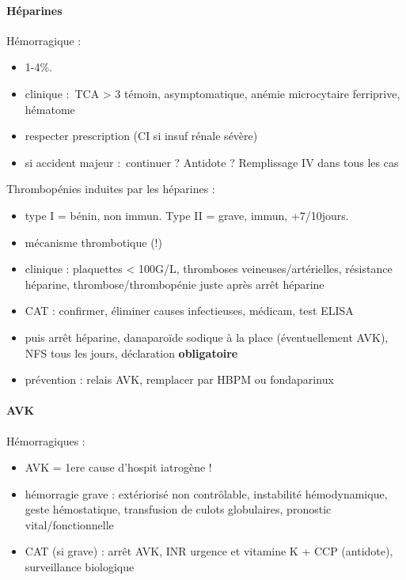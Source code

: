 \paragraph{Héparines}
Hémorragique : 
\begin{itemize}
  \item 1-4\%.
  \item clinique : TCA > 3 témoin, asymptomatique, anémie microcytaire
    ferriprive, hématome
  \item respecter prescription (CI si insuf rénale sévère)
  \item si accident majeur : continuer ? Antidote ? Remplissage IV dans tous les
    cas
\end{itemize}
Thrombopénies induites par les héparines : 
\begin{itemize}
  \item type I = bénin, non immun. Type II = grave, immun, +7/10jours.
  \item mécanisme thrombotique (!)
  \item clinique : plaquettes < 100G/L, thromboses veineuses/artérielles,
    résistance héparine, thrombose/thrombopénie juste après arrêt héparine
  \item CAT : confirmer, éliminer causes infectieuses, médicam, test ELISA
  \item puis arrêt héparine, danaparoïde sodique à la place (éventuellement
    AVK), NFS tous les jours, déclaration \textbf{obligatoire} 
  \item prévention : relais AVK, remplacer par HBPM ou fondaparinux
\end{itemize}

\paragraph{AVK}
Hémorragiques : 
\begin{itemize}
  \item AVK = 1ere cause d'hospit iatrogène !
  \item hémorragie grave : extériorisé non contrôlable, instabilité
    hémodynamique, geste hémostatique, transfusion de culots globulaires,
    pronostic vital/fonctionnelle
  \item CAT (si grave) : arrêt AVK, INR urgence et vitamine K + CCP (antidote),
    surveillance biologique
\end{itemize}









